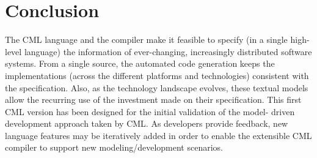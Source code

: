 \section{Conclusion}\label{sec:conclusion}

The CML language and the compiler make it feasible
to specify (in a single high-level language) the information of ever-changing,
increasingly distributed software systems.
From a single source,
the automated code generation keeps the implementations 
(across the different platforms and technologies) consistent with the specification.
Also, as the technology landscape evolves, these textual models allow the recurring
use of the investment made on their specification.
This first CML version has been designed for the initial validation of the model- driven development approach taken by CML.
As developers provide feedback,
new language features may be iteratively added in order to enable the extensible CML compiler to support new modeling/development scenarios.